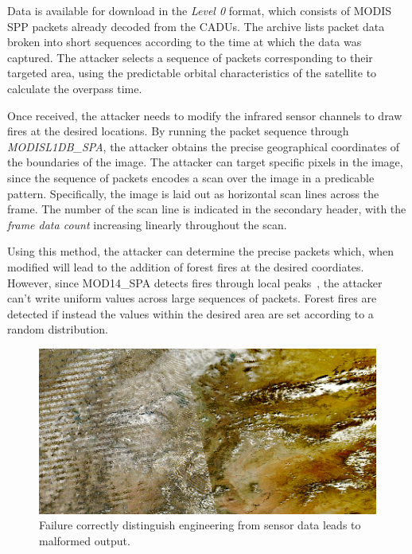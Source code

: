 Data is available for download in the \textit{Level 0} format, which consists of MODIS SPP packets already decoded from the CADUs.
The archive lists packet data broken into short sequences according to the time at which the data was captured.
The attacker selects a sequence of packets corresponding to their targeted area, using the predictable orbital characteristics of the satellite to calculate the overpass time.

Once received, the attacker needs to modify the infrared sensor channels to draw fires at the desired locations.
By running the packet sequence through \textit{MODISL1DB\_SPA}, the attacker obtains the precise geographical coordinates of the boundaries of the image.
The attacker can target specific pixels in the image, since the sequence of packets encodes a scan over the image in a predicable pattern.
Specifically, the image is laid out as horizontal scan lines across the frame.
The number of the scan line is indicated in the secondary header, with the \textit{frame data count} increasing linearly throughout the scan.

Using this method, the attacker can determine the precise packets which, when modified will lead to the addition of forest fires at the desired coordiates.
However, since MOD14\_SPA detects fires through local peaks~\cite{mod14Manual}, the attacker can't write uniform values across large sequences of packets.
Forest fires are detected if instead the values within the desired area are set according to a random distribution.

\begin{figure}
    \includegraphics[width=\columnwidth]{diagrams/interleave.png}
    \caption{Failure correctly distinguish engineering from sensor data leads to malformed output.}
    \label{fig:interleave}
\end{figure}

